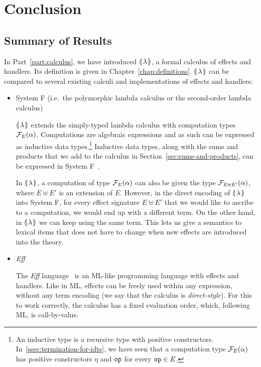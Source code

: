 \chapter*{Conclusion}

\section{Summary of Results}

In Part~\ref{part:calculus}, we have introduced ${\llparenthesis \, \lambda \, \rrparenthesis}$, a formal calculus
of effects and handlers. Its definition is given in
Chapter~\ref{chap:definitions}. ${\llparenthesis \, \lambda \, \rrparenthesis}$ can be compared to several existing
calculi and implementations of effects and handlers:

\begin{itemize}
\item System F (i.e.\ the polymorphic lambda calculus or the second-order
  lambda calculus)

  ${\llparenthesis \, \lambda \, \rrparenthesis}$ extends the simply-typed lambda calculus with computation types
  $\mathcal{F}_E(\alpha)$. Computations are algebraic expressions and as such can
  be expressed as inductive data types.\footnote{An inductive type is a
    recursive type with positive
    constructors. In~\ref{ssec:termination-for-idts}, we have seen that a
    computation type $\mathcal{F}_E(\alpha)$ has positive constructors $\eta$ and
    $\mathtt{op}$ for every $\mathtt{op} \in E$.} Inductive data types, along with
  the sums and products that we add to the calculus in
  Section~\ref{sec:sums-and-products}, can be expressed in System
  F~\cite{wadler1990recursive}.

  In ${\llparenthesis \, \lambda \, \rrparenthesis}$, a computation of type $\mathcal{F}_E(\alpha)$ can also be given the
  type $\mathcal{F}_{E \uplus E'}(\alpha)$, where $E \uplus E'$ is an extension of
  $E$. However, in the direct encoding of ${\llparenthesis \, \lambda \, \rrparenthesis}$ into System F, for every
  effect signature $E \uplus E'$ that we would like to ascribe to a
  computation, we would end up with a different term. On the other hand, in
  ${\llparenthesis \, \lambda \, \rrparenthesis}$ we can keep using the same term. This lets us give a semantics to
  lexical items that does not have to change when new effects are
  introduced into the theory.

\item \emph{Eff}

  The \emph{Eff} language~\cite{bauer2012programming} is an ML-like
  programming language with effects and handlers. Like in ML, effects can
  be freely used within any expression, without any term encoding (we say
  that the calculus is \emph{direct-style}). For this to work correctly,
  the calculus has a fixed evaluation order, which, following ML, is
  call-by-value.


\end{itemize}
